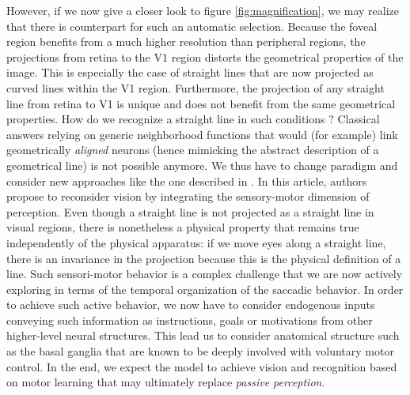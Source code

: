 However, if we now give a closer look to figure \ref{fig:magnification}, we may
realize that there is counterpart for such an automatic selection. Because the
foveal region benefits from a much higher resolution than peripheral regions,
the projections from retina to the V1 region distorts the geometrical
properties of the image. This is especially the case of straight lines that are
now projected as curved lines within the V1 region. Furthermore, the projection
of any straight line from retina to V1 is unique and does not benefit from the
same geometrical properties. How do we recognize a straight line in such
conditions ? Classical answers relying on generic neighborhood functions that
would (for example) link geometrically {\em aligned} neurons (hence mimicking
the abstract description of a geometrical line) is not possible anymore. We
thus have to change paradigm and consider new approaches like the one described
in \cite{ORegan:2001}. In this article, authors propose to reconsider vision by
integrating the sensory-motor dimension of perception. Even though a straight
line is not projected as a straight line in visual regions, there is
nonetheless a physical property that remains true independently of the physical
apparatus: if we move eyes along a straight line, there is an invariance in the
projection because this is the physical definition of a line. Such
sensori-motor behavior is a complex challenge that we are now actively
exploring in terms of the temporal organization of the saccadic behavior. In
order to achieve such active behavior, we now have to consider endogenous
inputs conveying such information as instructions, goals or motivations from
other higher-level neural structures. This lead us to consider anatomical
structure such as the basal ganglia that are known to be deeply involved with
voluntary motor control. In the end, we expect the model to achieve vision and
recognition based on motor learning that may ultimately replace {\em passive
  perception}.





